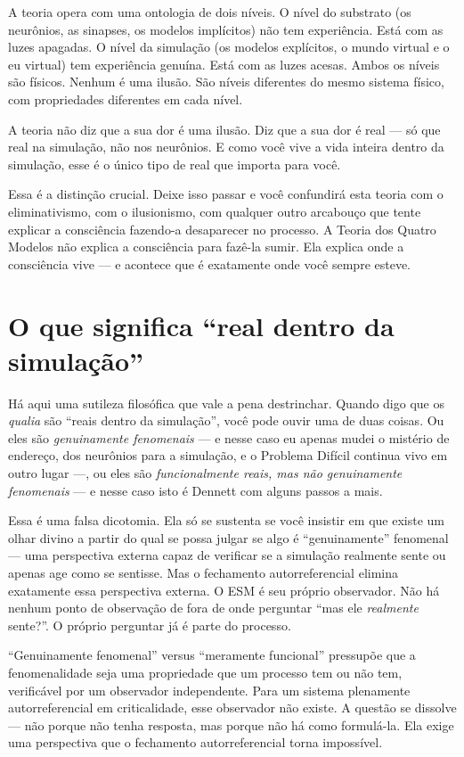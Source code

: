 \documentclass[11pt, twoside, openright]{book}
\begin{document}
A teoria opera com uma ontologia de dois níveis. O nível do substrato (os neurônios, as sinapses, os modelos implícitos) não tem experiência. Está com as luzes apagadas. O nível da simulação (os modelos explícitos, o mundo virtual e o eu virtual) tem experiência genuína. Está com as luzes acesas. Ambos os níveis são físicos. Nenhum é uma ilusão. São níveis diferentes do mesmo sistema físico, com propriedades diferentes em cada nível.

A teoria não diz que a sua dor é uma ilusão. Diz que a sua dor é real --- só que real na simulação, não nos neurônios. E como você vive a vida inteira dentro da simulação, esse é o único tipo de real que importa para você.

Essa é a distinção crucial. Deixe isso passar e você confundirá esta teoria com o eliminativismo, com o ilusionismo, com qualquer outro arcabouço que tente explicar a consciência fazendo-a desaparecer no processo. A Teoria dos Quatro Modelos não explica a consciência para fazê-la sumir. Ela explica onde a consciência vive --- e acontece que é exatamente onde você sempre esteve.

\section*{O que significa ``real dentro da simulação''}

Há aqui uma sutileza filosófica que vale a pena destrinchar. Quando digo que os \textit{qualia} são ``reais dentro da simulação'', você pode ouvir uma de duas coisas. Ou eles são \textit{genuinamente fenomenais} --- e nesse caso eu apenas mudei o mistério de endereço, dos neurônios para a simulação, e o Problema Difícil continua vivo em outro lugar ---, ou eles são \textit{funcionalmente reais, mas não genuinamente fenomenais} --- e nesse caso isto é Dennett com alguns passos a mais.

Essa é uma falsa dicotomia. Ela só se sustenta se você insistir em que existe um olhar divino a partir do qual se possa julgar se algo é ``genuinamente'' fenomenal --- uma perspectiva externa capaz de verificar se a simulação realmente sente ou apenas age como se sentisse. Mas o fechamento autorreferencial elimina exatamente essa perspectiva externa. O ESM é seu próprio observador. Não há nenhum ponto de observação de fora de onde perguntar ``mas ele \textit{realmente} sente?''. O próprio perguntar já é parte do processo.

``Genuinamente fenomenal'' versus ``meramente funcional'' pressupõe que a fenomenalidade seja uma propriedade que um processo tem ou não tem, verificável por um observador independente. Para um sistema plenamente autorreferencial em criticalidade, esse observador não existe. A questão se dissolve --- não porque não tenha resposta, mas porque não há como formulá-la. Ela exige uma perspectiva que o fechamento autorreferencial torna impossível.
\end{document}
